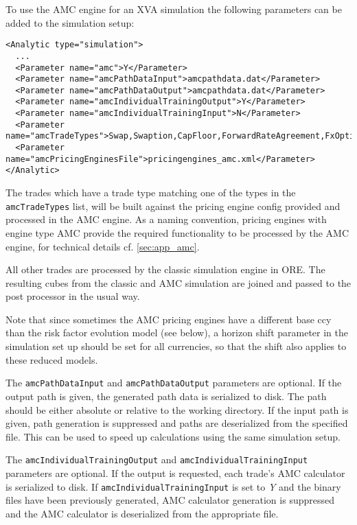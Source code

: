 \documentclass[12pt, a4paper]{article}
\begin{document}
To use the AMC engine for an XVA simulation the following parameters can be added to the simulation setup:

\begin{verbatim}
<Analytic type="simulation">
  ...
  <Parameter name="amc">Y</Parameter>
  <Parameter name="amcPathDataInput">amcpathdata.dat</Parameter>
  <Parameter name="amcPathDataOutput">amcpathdata.dat</Parameter>
  <Parameter name="amcIndividualTrainingOutput">Y</Parameter>
  <Parameter name="amcIndividualTrainingInput">N</Parameter>
  <Parameter name="amcTradeTypes">Swap,Swaption,CapFloor,ForwardRateAgreement,FxOption,BermudanSwaption</Parameter>
  <Parameter name="amcPricingEnginesFile">pricingengines_amc.xml</Parameter>
</Analytic>
\end{verbatim}

The trades which have a trade type matching one of the types in the \verb+amcTradeTypes+ list, will be built against the
pricing engine config provided and processed in the AMC engine. As a naming convention, pricing engines with engine type
AMC provide the required functionality to be processed by the AMC engine, for technical details cf. \ref{sec:app_amc}.

All other trades are processed by the classic simulation engine in ORE. The resulting cubes from the classic and AMC
simulation are joined and passed to the post processor in the usual way.

Note that since sometimes the AMC pricing engines have a different base ccy than the risk factor evolution model (see
below), a horizon shift parameter in the simulation set up should be set for all currencies, so that the shift also
applies to these reduced models.

The \verb+amcPathDataInput+ and \verb+amcPathDataOutput+ parameters are optional. If the output path is given, the
generated path data is serialized to disk. The path should be either absolute or relative to the working directory. If
the input path is given, path generation is suppressed and paths are deserialized from the specified file. This can be
used to speed up calculations using the same simulation setup.

The \verb+amcIndividualTrainingOutput+ and \verb+amcIndividualTrainingInput+ parameters are optional. If the output is requested, each trade's
AMC calculator is serialized to disk. If \verb+amcIndividualTrainingInput+ is set to \emph{Y} and the binary files have been previously generated, 
AMC calculator generation is suppressed and the AMC calculator is deserialized from the appropriate file.
\end{document}
